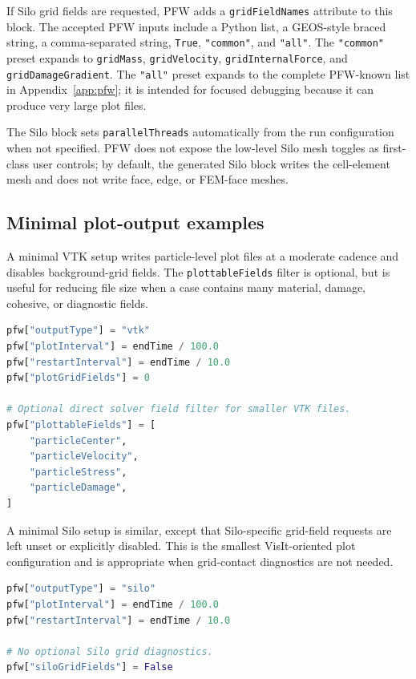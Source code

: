 If Silo grid fields are requested, PFW adds a \texttt{gridFieldNames} attribute to this block.  The accepted PFW inputs include a Python list, a GEOS-style braced string, a comma-separated string, \texttt{True}, \texttt{"common"}, and \texttt{"all"}.  The \texttt{"common"} preset expands to \texttt{gridMass}, \texttt{gridVelocity}, \texttt{gridInternalForce}, and \texttt{gridDamageGradient}.  The \texttt{"all"} preset expands to the complete PFW-known list in Appendix~\ref{app:pfw}; it is intended for focused debugging because it can produce very large plot files.

The Silo block sets \texttt{parallelThreads} automatically from the run configuration when not specified.  PFW does not expose the low-level Silo mesh toggles as first-class user controls; by default, the generated Silo block writes the cell-element mesh and does not write face, edge, or FEM-face meshes.

\subsection{Minimal plot-output examples}
\label{sec:pfw-minimal-output-examples}

A minimal VTK setup writes particle-level plot files at a moderate cadence and disables background-grid fields.  The \texttt{plottableFields} filter is optional, but is useful for reducing file size when a case contains many material, damage, cohesive, or diagnostic fields.

\begin{lstlisting}[language=Python,caption={Minimal VTK/ParaView plot output.}]
pfw["outputType"] = "vtk"
pfw["plotInterval"] = endTime / 100.0
pfw["restartInterval"] = endTime / 10.0
pfw["plotGridFields"] = 0

# Optional direct solver field filter for smaller VTK files.
pfw["plottableFields"] = [
    "particleCenter",
    "particleVelocity",
    "particleStress",
    "particleDamage",
]
\end{lstlisting}

A minimal Silo setup is similar, except that Silo-specific grid-field requests are left unset or explicitly disabled.  This is the smallest VisIt-oriented plot configuration and is appropriate when grid-contact diagnostics are not needed.

\begin{lstlisting}[language=Python,caption={Minimal Silo/VisIt plot output.}]
pfw["outputType"] = "silo"
pfw["plotInterval"] = endTime / 100.0
pfw["restartInterval"] = endTime / 10.0

# No optional Silo grid diagnostics.
pfw["siloGridFields"] = False
\end{lstlisting}

